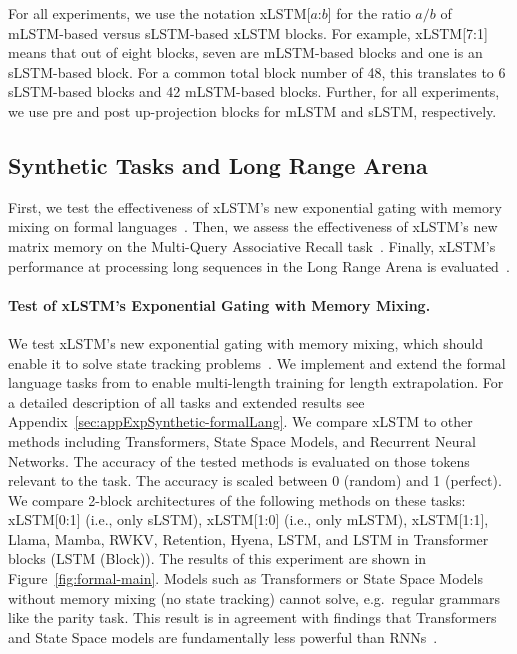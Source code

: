 \label{sec:xlstm_blocks_notation}
For all experiments, we use the notation xLSTM[$a$:$b$] for the ratio $a/b$ of mLSTM-based versus sLSTM-based xLSTM blocks. For example, xLSTM[7:1] means that out of eight blocks, seven are mLSTM-based blocks and one is an sLSTM-based block. For a common total block number of 48, this translates to 6 sLSTM-based blocks and 42 mLSTM-based blocks. Further, for all experiments, we use pre and post up-projection blocks for mLSTM and sLSTM, respectively. 

\subsection{Synthetic Tasks and Long Range Arena}
\label{sec:ExpSyntethic}
First, we test the effectiveness of xLSTM's new exponential gating with memory mixing on formal languages~\citep{Deletang:23}. Then, we assess the effectiveness of xLSTM's new matrix memory on the Multi-Query Associative Recall task~\citep{Arora:23arxiv}. Finally, xLSTM's performance at processing long sequences in the Long Range Arena is evaluated~\citep{Tay:21}.

\paragraph{Test of xLSTM's Exponential Gating with Memory Mixing.} We test xLSTM's new exponential gating with memory mixing, which should enable it to solve state tracking problems~\citep{Merrill:24, Merrill:23}. We implement and extend the formal language tasks from \citet{Deletang:23}
to enable multi-length training for length extrapolation. For a detailed description of all tasks and extended results see 
Appendix~\ref{sec:appExpSynthetic-formalLang}. 
We compare xLSTM to other methods including Transformers, State Space Models, and Recurrent Neural Networks. The accuracy of the tested methods is evaluated on those tokens relevant to the task. The accuracy is scaled between 0 (random) and 1 (perfect). We compare 2-block architectures of the following methods on these tasks: xLSTM[0:1] (i.e., only sLSTM), xLSTM[1:0] (i.e., only mLSTM), xLSTM[1:1], Llama, Mamba, RWKV, Retention, Hyena, LSTM, and LSTM in Transformer blocks (LSTM (Block)). The results of this experiment are shown in Figure~\ref{fig:formal-main}.
Models such as Transformers or State Space Models without memory mixing (no state tracking) cannot solve, e.g.\ regular grammars like the parity task. This result is in agreement with findings that Transformers and State Space models are fundamentally less powerful than RNNs~\citep{Merrill:24, Merrill:23, Deletang:23}. 

